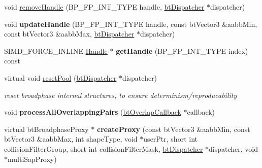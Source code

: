 \begin{DoxyCompactItemize}
\item 
void \hyperlink{classbt_axis_sweep3_internal_a4e26f4f8acf63f26451f6396223001bb}{remove\+Handle} (B\+P\+\_\+\+F\+P\+\_\+\+I\+N\+T\+\_\+\+T\+Y\+P\+E handle, \hyperlink{classbt_dispatcher}{bt\+Dispatcher} $\ast$dispatcher)
\item 
\hypertarget{classbt_axis_sweep3_internal_ac9852514d20572ebdde3e72215b09410}{void {\bfseries update\+Handle} (B\+P\+\_\+\+F\+P\+\_\+\+I\+N\+T\+\_\+\+T\+Y\+P\+E handle, const bt\+Vector3 \&aabb\+Min, const bt\+Vector3 \&aabb\+Max, \hyperlink{classbt_dispatcher}{bt\+Dispatcher} $\ast$dispatcher)}\label{classbt_axis_sweep3_internal_ac9852514d20572ebdde3e72215b09410}

\item 
\hypertarget{classbt_axis_sweep3_internal_a81b3aec13efa5d879c8ffeb4adb9af7e}{S\+I\+M\+D\+\_\+\+F\+O\+R\+C\+E\+\_\+\+I\+N\+L\+I\+N\+E \hyperlink{classbt_axis_sweep3_internal_1_1_handle}{Handle} $\ast$ {\bfseries get\+Handle} (B\+P\+\_\+\+F\+P\+\_\+\+I\+N\+T\+\_\+\+T\+Y\+P\+E index) const }\label{classbt_axis_sweep3_internal_a81b3aec13efa5d879c8ffeb4adb9af7e}

\item 
\hypertarget{classbt_axis_sweep3_internal_aeecfcc066ca77ec8b9bf2c8d422716ee}{virtual void \hyperlink{classbt_axis_sweep3_internal_aeecfcc066ca77ec8b9bf2c8d422716ee}{reset\+Pool} (\hyperlink{classbt_dispatcher}{bt\+Dispatcher} $\ast$dispatcher)}\label{classbt_axis_sweep3_internal_aeecfcc066ca77ec8b9bf2c8d422716ee}

\begin{DoxyCompactList}\small\item\em reset broadphase internal structures, to ensure determinism/reproducability \end{DoxyCompactList}\item 
\hypertarget{classbt_axis_sweep3_internal_adc81ed36fde6cccd3e9fcb2ec3bc759c}{void {\bfseries process\+All\+Overlapping\+Pairs} (\hyperlink{structbt_overlap_callback}{bt\+Overlap\+Callback} $\ast$callback)}\label{classbt_axis_sweep3_internal_adc81ed36fde6cccd3e9fcb2ec3bc759c}

\item 
\hypertarget{classbt_axis_sweep3_internal_aa640bd232bae128a3551acbf2cb01116}{virtual bt\+Broadphase\+Proxy $\ast$ {\bfseries create\+Proxy} (const bt\+Vector3 \&aabb\+Min, const bt\+Vector3 \&aabb\+Max, int shape\+Type, void $\ast$user\+Ptr, short int collision\+Filter\+Group, short int collision\+Filter\+Mask, \hyperlink{classbt_dispatcher}{bt\+Dispatcher} $\ast$dispatcher, void $\ast$multi\+Sap\+Proxy)}\label{classbt_axis_sweep3_internal_aa640bd232bae128a3551acbf2cb01116}


\end{DoxyCompactItemize}
